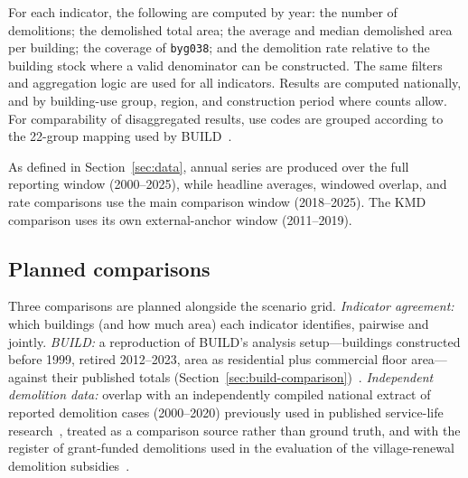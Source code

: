 For each indicator, the following are computed by year: the number of
demolitions; the demolished total area; the average and median demolished
area per building; the coverage of \texttt{byg038}; and the demolition
rate relative to the building stock where a valid denominator can be
constructed. The same filters and aggregation logic are used for all
indicators. Results are computed nationally, and by building-use group,
region, and construction period where counts allow. For comparability of
disaggregated results, use codes are grouped according to the 22-group
mapping used by BUILD~\cite{jensen2025nedrivning}.

As defined in Section~\ref{sec:data}, annual series are produced over
the full reporting window (2000--2025), while headline averages,
windowed overlap, and rate comparisons use the main comparison window
(2018--2025). The KMD comparison uses its own external-anchor window
(2011--2019).

\subsection{Planned comparisons}\label{sec:comparisons}

Three comparisons are planned alongside the scenario grid.
\emph{Indicator agreement:} which buildings (and how much area) each
indicator identifies, pairwise and jointly.
\emph{BUILD:} a reproduction of BUILD's analysis setup---buildings
constructed before 1999, retired 2012--2023, area as residential plus
commercial floor area---against their published totals
(Section~\ref{sec:build-comparison})~\cite{jensen2025nedrivning}.
\emph{Independent demolition data:} overlap with an independently
compiled national extract of reported demolition cases (2000--2020)
previously used in published service-life
research~\cite{andersen2022adaptation, andersen2023lifespan}, treated as
a comparison source rather than ground truth, and with the register of
grant-funded demolitions used in the evaluation of the village-renewal
demolition subsidies~\cite{jensen2019landsbyfornyelse}.
